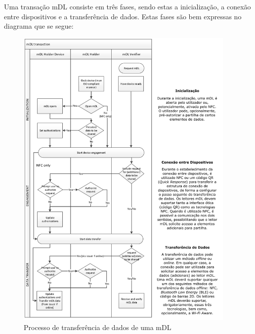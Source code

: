 
Uma transação mDL consiste em três fases, sendo estas a inicialização, a conexão entre dispositivos e a transferência de dados. Estas fases são bem expressas no diagrama que se segue:

\begin{figure}[H]
    \centering
    \includegraphics[width=0.95\textwidth]{../images/mDL_transaction.png}
    \caption{Processo de transferência de dados de uma mDL}
    \label{fig:}
\end{figure}
